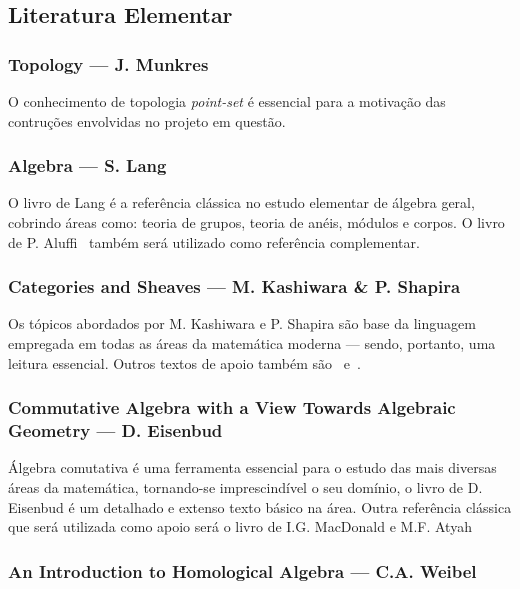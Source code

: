 \documentclass[11pt,reqno]{amsart}
\theoremstyle{definition}
\begin{document}
\subsection{Literatura Elementar}\label{sub:lit-elem}

\subsubsection{\textbf{Topology} --- J. Munkres~\cite{Mun00}}

O conhecimento de topologia \textit{point-set} é essencial para a motivação das
contruções envolvidas no projeto em questão.

\subsubsection{\textbf{Algebra} --- S. Lang~\cite{Lang93}}

O livro de Lang é a referência clássica no estudo elementar de álgebra geral,
cobrindo áreas como: teoria de grupos, teoria de anéis, módulos e corpos. O
livro de P. Aluffi~\cite{Aluf09} também será utilizado como referência
complementar.

\subsubsection{%
  \textbf{Categories and Sheaves} --- M. Kashiwara \& P. Shapira~\cite{Shap06}
}%

Os tópicos abordados por M. Kashiwara e P. Shapira são base da linguagem
empregada em todas as áreas da matemática moderna --- sendo, portanto, uma
leitura essencial. Outros textos de apoio também são~\cite{Rie16}
e~\cite{MacLane78}.

\subsubsection{
  \textbf{Commutative Algebra with a View Towards Algebraic Geometry}
  --- D. Eisenbud~\cite{Eisen95}
}

Álgebra comutativa é uma ferramenta essencial para o estudo das mais diversas
áreas da matemática, tornando-se imprescindível o seu domínio, o livro de
D. Eisenbud é um detalhado e extenso texto básico na área. Outra referência
clássica que será utilizada como apoio será o livro de I.G. MacDonald e
M.F. Atyah~\cite{MacDAty69}

\subsubsection{%
  \textbf{An Introduction to Homological Algebra} --- C.A. Weibel~\cite{Wei95}
}%
\end{document}
